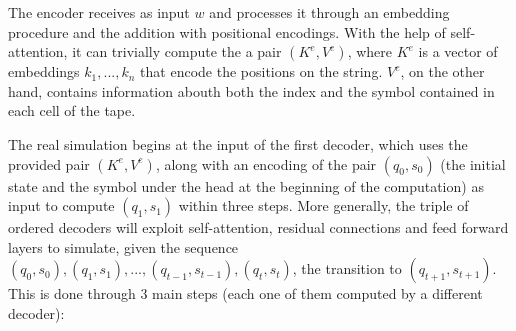 \documentclass{article}
\begin{document}
The encoder receives as input $w$ and processes it through an embedding procedure and the addition with positional encodings. With the help of self-attention, it can trivially compute the a pair $(K^e, V^e)$, where $K^e$ is a vector of embeddings $k_1,...,k_n$ that encode the positions on the string. $V^e$, on the other hand, contains information abouth both the index and the symbol contained in each cell of the tape. 

The real simulation begins at the input of the first decoder, which uses the provided pair $(K^e, V^e)$, along with an encoding of the pair $(q_0, s_0)$ (the initial state and the symbol under the head at the beginning of the computation) as input to compute $(q_1, s_1)$ within three steps. More generally, the triple of ordered decoders will exploit self-attention, residual connections and feed forward layers to simulate, given the sequence $(q_0,s_0),(q_1,s_1),...,(q_{t-1},s_{t-1}),(q_t,s_t)$, the transition to $(q_{t+1},s_{t+1})$.
This is done through 3 main steps (each one of them computed by a different decoder):
\end{document}
